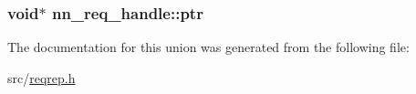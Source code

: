 \subsubsection[{ptr}]{\setlength{\rightskip}{0pt plus 5cm}void$\ast$ nn\+\_\+req\+\_\+handle\+::ptr}\hypertarget{unionnn__req__handle_aa2688ebeaa0a23aa18c36927331a8d52}{}\label{unionnn__req__handle_aa2688ebeaa0a23aa18c36927331a8d52}


The documentation for this union was generated from the following file\+:\begin{DoxyCompactItemize}
\item 
src/\hyperlink{reqrep_8h}{reqrep.\+h}\end{DoxyCompactItemize}
